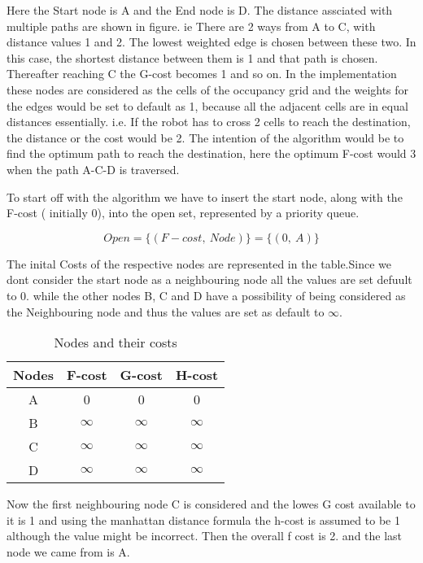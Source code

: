 Here the Start node is A and the End node is D. The distance assciated with multiple paths are shown in figure. ie There are 2 ways from A to C, with distance values 1 and 2. The lowest weighted edge is chosen between these two. In this case, the shortest distance between them is 1 and that path is chosen. Thereafter reaching C the G-cost becomes 1 and so on. In the implementation these nodes are considered as the cells of the occupancy grid and the weights for the edges would be set to default as 1, because all the adjacent cells are in equal distances essentially. i.e. If the robot has to cross 2 cells to reach the destination, the distance or the cost would be 2. The intention of the algorithm would be to find the optimum path to reach the destination, here the optimum F-cost would 3 when the path A-C-D is traversed.

To start off with the algorithm we have to insert the start node, along with the F-cost ( initially 0), into the open set, represented by a priority queue. 

\[Open = \{(F-cost, \ Node)\} = \{(0, \ A)\}\]

The inital Costs of the respective nodes are represented in the table.Since we dont consider the start node as a neighbouring node all the values are set defuult to 0. while the other nodes B, C and D have a possibility of being considered as the Neighbouring node and thus the values are set as default to $\infty$. 

\begin{table}
\centering
    \begin{tabular}{ |c|c|c|c| } 
    \hline
    Nodes & F-cost & G-cost & H-cost \\
    \hline 
    A & 0 & 0 & 0\\ 
    B & $\infty$ & $\infty$ & $\infty$\\ 
    C & $\infty$ & $\infty$ & $\infty$\\ 
    D & $\infty$ & $\infty$ & $\infty$\\
    \hline
    \end{tabular}
    \caption{Nodes and their costs}
    \label{table:nodeCost0}
\end{table}

Now the first neighbouring node C is considered and the lowes G cost available to it is 1 and using the manhattan distance formula the h-cost is assumed to be 1 although the value might be incorrect. Then the overall f cost is 2. and the last node we came from is A. 

